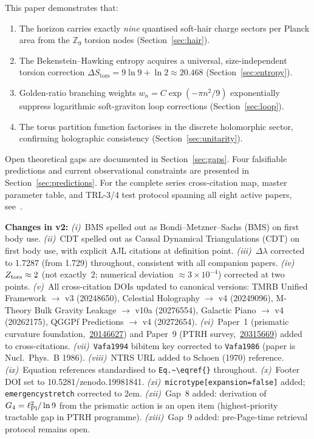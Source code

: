 \documentclass[11pt,a4paper]{article}
\begin{document}
This paper demonstrates that:
\begin{enumerate}[leftmargin=*, label=\arabic*.]
  \item The horizon carries exactly \emph{nine} quantised soft-hair charge sectors
    per Planck area from the $\mathbb{Z}_9$ torsion nodes (Section~\ref{sec:hair}).
  \item The Bekenstein--Hawking entropy acquires a universal, size-independent
    torsion correction $\Delta S_{\mathrm{tors}} = 9\ln 9 + \ln 2 \approx 20.468$
    (Section~\ref{sec:entropy}).
  \item Golden-ratio branching weights $w_n = C\exp(-\pi n^2/9)$ exponentially
    suppress logarithmic soft-graviton loop corrections
    (Section~\ref{sec:loop}).
  \item The torus partition function factorises in the discrete holomorphic sector,
    confirming holographic consistency (Section~\ref{sec:unitarity}).
\end{enumerate}

Open theoretical gaps are documented in Section~\ref{sec:gaps}.
Four falsifiable predictions and current observational constraints are
presented in Section~\ref{sec:predictions}.
For the complete series cross-citation map, master parameter table, and
TRL-3/4 test protocol spanning all eight active papers, see~\cite{BresslerSurvey2026}.

\smallskip
\noindent\textbf{Changes in v2:}
\textit{(i)}~BMS spelled out as Bondi--Metzner--Sachs (BMS) on first body use.
\textit{(ii)}~CDT spelled out as Causal Dynamical Triangulations (CDT) on first body use, with explicit AJL citations at definition point.
\textit{(iii)}~$\Delta\lambda$ corrected to 1.7287 (from 1.729) throughout, consistent with all companion papers.
\textit{(iv)}~$Z_{\rm tors} \approx 2$ (not exactly~2; numerical deviation ${\approx}3\times10^{-4}$) corrected at two points.
\textit{(v)}~All cross-citation DOIs updated to canonical versions: TMRB Unified Framework $\to$ v3 (20248650), Celestial Holography $\to$ v4 (20249096), M-Theory Bulk Gravity Leakage $\to$ v10a (20276554), Galactic Piano $\to$ v4 (20262175), QGGPf Predictions $\to$ v4 (20272654).
\textit{(vi)}~Paper~1 (prismatic curvature foundation,~\href{https://doi.org/10.5281/zenodo.20146627}{20146627}) and Paper~9 (PTRH survey,~\href{https://doi.org/10.5281/zenodo.20315669}{20315669}) added to cross-citations.
\textit{(vii)}~\texttt{Vafa1994} bibitem key corrected to \texttt{Vafa1986} (paper is Nucl.~Phys.~B 1986).
\textit{(viii)}~NTRS URL added to Schoen (1970) reference.
\textit{(ix)}~Equation references standardised to \texttt{Eq.\textasciitilde\textbackslash eqref\{\}} throughout.
\textit{(x)}~Footer DOI set to 10.5281/zenodo.19981841.
\textit{(xi)}~\texttt{microtype[expansion=false]} added; \texttt{emergencystretch} corrected to 2em.
\textit{(xii)}~Gap~8 added: derivation of $G_4 = \ell_{\rm Pl}^2/\ln 9$ from the prismatic action is an open item (highest-priority tractable gap in PTRH programme).
\textit{(xiii)}~Gap~9 added: pre-Page-time retrieval protocol remains open.
\end{document}
